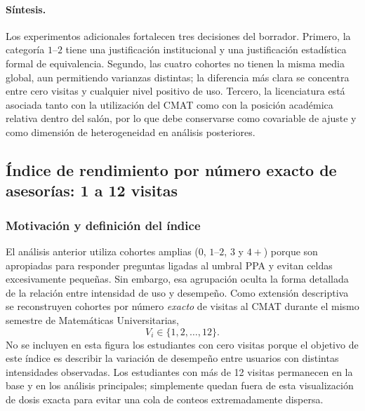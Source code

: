 \paragraph{Síntesis.}
Los experimentos adicionales fortalecen tres decisiones del borrador. Primero, la categoría $1$--$2$ tiene una justificación institucional y una justificación estadística formal de equivalencia. Segundo, las cuatro cohortes no tienen la misma media global, aun permitiendo varianzas distintas; la diferencia más clara se concentra entre cero visitas y cualquier nivel positivo de uso. Tercero, la licenciatura está asociada tanto con la utilización del CMAT como con la posición académica relativa dentro del salón, por lo que debe conservarse como covariable de ajuste y como dimensión de heterogeneidad en análisis posteriores.

\subsection{Índice de rendimiento por número exacto de asesorías: 1 a 12 visitas}
\label{subsec:indice_exacto_1_12}

\subsubsection{Motivación y definición del índice}

El análisis anterior utiliza cohortes amplias ($0$, $1$--$2$, $3$ y $4+$) porque son apropiadas para responder preguntas ligadas al umbral PPA y evitan celdas excesivamente pequeñas. Sin embargo, esa agrupación oculta la forma detallada de la relación entre intensidad de uso y desempeño. Como extensión descriptiva se reconstruyen cohortes por número \emph{exacto} de visitas al CMAT durante el mismo semestre de Matemáticas Universitarias,
\[
V_i\in\{1,2,\ldots,12\}.
\]
No se incluyen en esta figura los estudiantes con cero visitas porque el objetivo de este índice es describir la variación de desempeño entre usuarios con distintas intensidades observadas. Los estudiantes con más de 12 visitas permanecen en la base y en los análisis principales; simplemente quedan fuera de esta visualización de dosis exacta para evitar una cola de conteos extremadamente dispersa.

